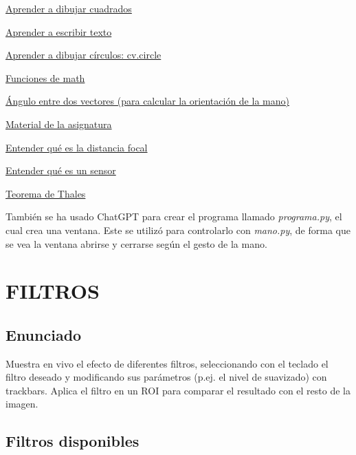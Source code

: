 \documentclass[12pt]{article}
\begin{document}
\href{https://docs.opencv.org/3.4/d6/d6e/group__imgproc__draw.html#ga07d2f74cadcf8e305e810ce8eed13bc9}{Aprender a dibujar cuadrados}

\href{https://docs.opencv.org/3.4/d6/d6e/group__imgproc__draw.html#ga5126f47f883d730f633d74f07456c576}{Aprender a escribir texto}

\href{https://docs.opencv.org/3.4/d6/d6e/group__imgproc__draw.html#gaf10604b069374903dbd0f0488cb43670}{Aprender a dibujar círculos: cv.circle}

\href{https://docs.python.org/3/library/math.html}{Funciones de math}

\href{https://www.superprof.es/apuntes/escolar/matematicas/analitica/vectores/angulo-de-dos-vectores.html}{Ángulo entre dos vectores (para calcular la orientación de la mano)}

\href{https://github.com/albertoruiz/umucv/blob/master/notebooks/imagen.ipynb}{Material de la asignatura}

\href{https://www.sony.es/electronics/support/articles/00267921}{Entender qué es la distancia focal}

\href{https://www.blogdelfotografo.com/tipos-caracteristicas-ventajas-sensores-camaras-fotos/}{Entender qué es un sensor}

\href{https://www.superprof.es/apuntes/escolar/matematicas/geometria/basica/triangulos-en-posicion-de-thales.html}{Teorema de Thales}

También se ha usado ChatGPT para crear el programa llamado \textit{programa.py}, el cual crea una ventana. Este se utilizó para controlarlo con \textit{mano.py}, de forma que se vea la ventana abrirse y cerrarse según el gesto de la mano.

\newpage

\section{FILTROS}
\subsection*{Enunciado}

Muestra en vivo el efecto de diferentes filtros, seleccionando con el teclado el filtro deseado y modificando sus parámetros (p.ej. el nivel de suavizado) con trackbars. Aplica el filtro en un ROI para comparar el resultado con el resto de la imagen.

\subsection*{Filtros disponibles}
\end{document}
